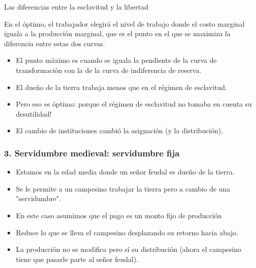 \documentclass{beamer}
\begin{document}
\begin{frame}{Las diferencias entre la esclavitud y la libertad}
        \begin{boxB}
        \centering
        En el óptimo, el trabajador elegirá el nivel de trabajo donde el costo marginal iguala a la producción marginal, que es el punto en el que se maximiza la diferencia entre estas dos curvas.
        \end{boxB}
        \begin{itemize}
        \item El punto máximo es cuando se iguala la pendiente de la curva de transformación con la de la curva de indiferencia de reserva. 
        \item El dueño de la tierra trabaja menos que en el régimen de esclavitud.
        \item Pero eso es óptimo: porque el régimen de esclavitud no tomaba en cuenta su desutilidad!
        \item El cambio de instituciones cambió la asignación (y la distribución).
    \end{itemize}
\end{frame}


\begin{frame}
\frametitle{3. Servidumbre medieval: servidumbre fija }
\begin{itemize}
    \item Estamos en la edad media donde un señor feudal es dueño de la tierra. 
\item Se le permite a un campesino trabajar la tierra pero a cambio de una "servidumbre". 
    \item  En este caso asumimos que el pago es un monto fijo de producción 
    \item Reduce lo que se lleva el campesino desplazando su retorno hacia abajo.
    \item La producción no se modifica pero sí su distribución (ahora el campesino tiene que pasarle parte al señor feudal). 
\end{itemize}
\end{frame}
\end{document}
